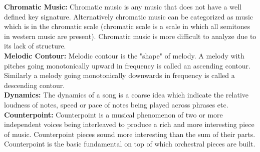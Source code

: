 \noindent \textbf{Chromatic Music:} Chromatic music is any music that does not have a well defined key signature. Alternatively chromatic music can be categorized as music which is in the chromatic scale (chromatic scale is a scale in which all semitones in western music are present). Chromatic music is more difficult to analyze due to its lack of structure. \\

\noindent \textbf{Melodic Contour:} Melodic contour is the "shape" of melody. A melody with pitches going monotonically upward in frequency is called an ascending contour. Similarly a melody going monotonically downwards in frequency is called a descending contour. \\

\noindent \textbf{Dynamics:} \label{dynamics} The dynamics of a song is a coarse idea which indicate the relative loudness of notes, speed or pace of notes being played across phrases etc. \\

\noindent \textbf{Counterpoint: } Counterpoint is a musical phenomenon of two or more independent voices being interleaved to produce a rich and more interesting piece of music. Counterpoint pieces sound more interesting than the sum of their parts. Counterpoint is the basic fundamental on top of which orchestral pieces are built. 